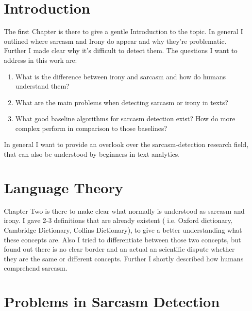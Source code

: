 \documentclass[sigconf,  review=false, nonacm=true]{acmart}
\begin{document}
\section{Introduction}

The first Chapter is there to give a gentle Introduction to the topic. In general I outlined where sarcasm and Irony do appear and why they're problematic.
Further I made clear why it's difficult to detect them. 
The questions I want to address in this work are:
\begin{enumerate} 
	\item What is the difference between irony and sarcasm and how do humans understand them?
	\item What are the main problems when detecting sarcasm or irony in texts?
	\item What good baseline algorithms for sarcasm detection exist? How do more complex perform in comparison to those baselines?
\end{enumerate}
In general I want to provide an overlook over the sarcasm-detection research field, that can also be understood by beginners in text analytics.



\section{Language Theory}

Chapter Two is there to make clear what normally is understood as sarcasm and irony. I gave 2-3 definitions that are already existent ( i.e. Oxford dictionary, Cambridge Dictionary, Collins Dictionary), to give a better understanding what these concepts are. Also I tried to differentiate between those two concepts, but found out there is no clear border and an actual an scientific dispute whether they are the same or different concepts. \cite{Irony-as-relevant-inappropriateness} \cite{Psychological_aspects_of_irony_understanding}  \cite{diff_irony_sarcasm}
Further I shortly described how humans comprehend sarcasm.


\section{Problems in Sarcasm Detection}
\end{document}
